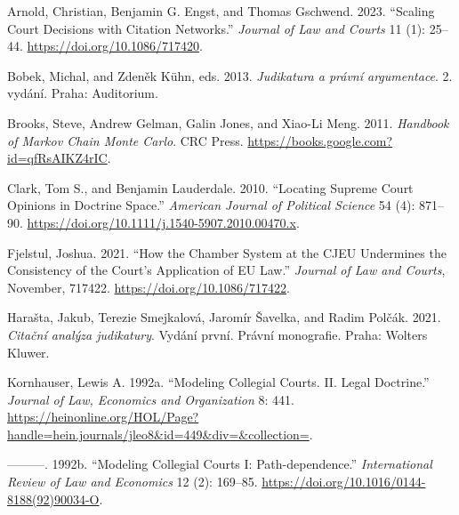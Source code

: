 \documentclass[
  11pt,
]{article}
\newlength{\cslhangindent}
\newenvironment{CSLReferences}[2] %
 {%
  \setlength{\parindent}{0pt}
  \ifodd #1 \everypar{\setlength{\hangindent}{\cslhangindent}}\ignorespaces\fi
  \ifnum #2 > 0
  \setlength{\parskip}{#2\baselineskip}
  \fi
 }%
 {}
\begin{document}
\hypertarget{refs}{}
\begin{CSLReferences}{1}{0}
\leavevmode{}%
Arnold, Christian, Benjamin G. Engst, and Thomas Gschwend. 2023.
{``Scaling {Court Decisions} with {Citation Networks}.''} \emph{Journal
of Law and Courts} 11 (1): 25--44. \url{https://doi.org/10.1086/717420}.

\leavevmode{}%
Bobek, Michal, and Zdeněk Kühn, eds. 2013. \emph{Judikatura a právní
argumentace}. 2. vydání. {Praha}: {Auditorium}.

\leavevmode{}%
Brooks, Steve, Andrew Gelman, Galin Jones, and Xiao-Li Meng. 2011.
\emph{Handbook of {Markov Chain Monte Carlo}}. {CRC Press}.
\url{https://books.google.com?id=qfRsAIKZ4rIC}.

\leavevmode{}%
Clark, Tom S., and Benjamin Lauderdale. 2010. {``Locating {Supreme Court
Opinions} in {Doctrine Space}.''} \emph{American Journal of Political
Science} 54 (4): 871--90.
\url{https://doi.org/10.1111/j.1540-5907.2010.00470.x}.

\leavevmode{}%
Fjelstul, Joshua. 2021. {``How the {Chamber System} at the {CJEU
Undermines} the {Consistency} of the {Court}'s {Application} of {EU
Law}.''} \emph{Journal of Law and Courts}, November, 717422.
\url{https://doi.org/10.1086/717422}.

\leavevmode{}%
Harašta, Jakub, Terezie Smejkalová, Jaromír Šavelka, and Radim Polčák.
2021. \emph{Citační analýza judikatury}. Vydání první. Právní
monografie. {Praha}: {Wolters Kluwer}.

\leavevmode{}%
Kornhauser, Lewis A. 1992a. {``Modeling {Collegial Courts}. {II}. {Legal
Doctrine}.''} \emph{Journal of Law, Economics and Organization} 8: 441.
\url{https://heinonline.org/HOL/Page?handle=hein.journals/jleo8&id=449&div=&collection=}.

\leavevmode{}%
---------. 1992b. {``Modeling Collegial Courts {I}:
{Path-dependence}.''} \emph{International Review of Law and Economics}
12 (2): 169--85. \url{https://doi.org/10.1016/0144-8188(92)90034-O}.


\end{CSLReferences}
\end{document}

